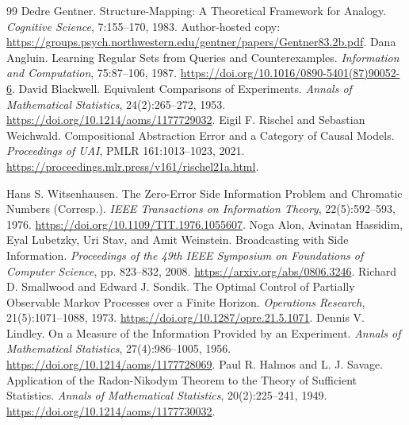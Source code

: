 \documentclass[11pt,oneside,openany]{book}
\numberwithin{equation}{section}
\begin{document}
\begin{thebibliography}{99}
 Dedre Gentner. Structure-Mapping: A Theoretical Framework for Analogy. \emph{Cognitive Science}, 7:155--170, 1983. Author-hosted copy: \url{https://groups.psych.northwestern.edu/gentner/papers/Gentner83.2b.pdf}.
 Dana Angluin. Learning Regular Sets from Queries and Counterexamples. \emph{Information and Computation}, 75:87--106, 1987. \url{https://doi.org/10.1016/0890-5401(87)90052-6}.
 David Blackwell. Equivalent Comparisons of Experiments. \emph{Annals of Mathematical Statistics}, 24(2):265--272, 1953. \url{https://doi.org/10.1214/aoms/1177729032}.
 Eigil F. Rischel and Sebastian Weichwald. Compositional Abstraction Error and a Category of Causal Models. \emph{Proceedings of UAI}, PMLR 161:1013--1023, 2021. \url{https://proceedings.mlr.press/v161/rischel21a.html}.

 Hans S. Witsenhausen. The Zero-Error Side Information Problem and Chromatic Numbers (Corresp.). \emph{IEEE Transactions on Information Theory}, 22(5):592--593, 1976. \url{https://doi.org/10.1109/TIT.1976.1055607}.
 Noga Alon, Avinatan Hassidim, Eyal Lubetzky, Uri Stav, and Amit Weinstein. Broadcasting with Side Information. \emph{Proceedings of the 49th IEEE Symposium on Foundations of Computer Science}, pp. 823--832, 2008. \url{https://arxiv.org/abs/0806.3246}.
 Richard D. Smallwood and Edward J. Sondik. The Optimal Control of Partially Observable Markov Processes over a Finite Horizon. \emph{Operations Research}, 21(5):1071--1088, 1973. \url{https://doi.org/10.1287/opre.21.5.1071}.
 Dennis V. Lindley. On a Measure of the Information Provided by an Experiment. \emph{Annals of Mathematical Statistics}, 27(4):986--1005, 1956. \url{https://doi.org/10.1214/aoms/1177728069}.
 Paul R. Halmos and L. J. Savage. Application of the Radon-Nikodym Theorem to the Theory of Sufficient Statistics. \emph{Annals of Mathematical Statistics}, 20(2):225--241, 1949. \url{https://doi.org/10.1214/aoms/1177730032}.
\end{thebibliography}
\end{document}
